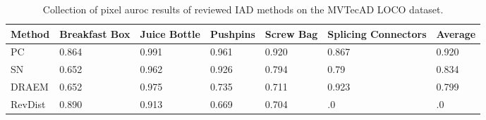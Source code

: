 \begin{table}[htbp]
    \tiny
    \centering
    \begin{tabularx}{\textwidth}{|X|X|X|X|X|X|X|}%
        \hline
        \textbf{Method} & \textbf{Breakfast Box} & \textbf{Juice Bottle} & \textbf{Pushpins} & \textbf{Screw Bag} & \textbf{Splicing Connectors} & \textbf{Average} \\
        \hline
        PC \cite{patchCore2022} & 0.864 & 0.991 & 0.961 & 0.920 & 0.867 & 0.920 \\
        \hline 
        SN \cite{liu2023simplenet} & 0.652 & 0.962 & 0.926 & 0.794 & 0.79 & 0.834 \\
        \hline
        DRAEM \cite{Zavrtanik_2021DRAEM} & 0.652 & 0.975 & 0.735 & 0.711 & 0.923 & 0.799 \\
        \hline
        RevDist \cite{revdist2023} & 0.890 & 0.913 & 0.669 & 0.704 & .0 & .0 \\
        \hline
    \end{tabularx}
    \caption{Collection of pixel auroc results of reviewed IAD methods on the MVTecAD LOCO \cite{LOCODentsAndScratchesBergmann2022} dataset.}
    \label{tab:pixelaurocloco}
\end{table}





